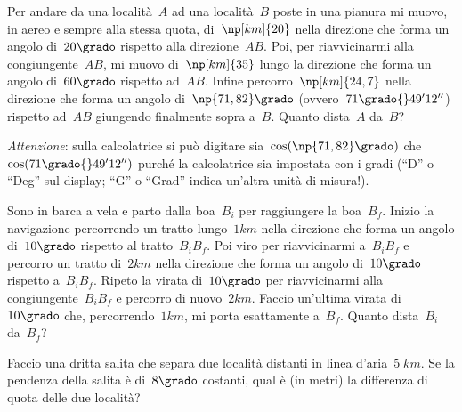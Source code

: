 \begin{multicols}{2}
\begin{esercizio}[\Ast]
\label{ese:C.43}
Per andare da una località~$A$ ad una località~$B$ poste in una pianura mi muovo, in aereo e sempre alla stessa quota, di~$\np[km]{20}$
nella direzione che forma un angolo di~$20\grado$ rispetto alla direzione~$AB$. Poi, per riavvicinarmi alla congiungente~$AB$,
mi muovo di~$\np[km]{35}$ lungo la direzione che forma un angolo di~$60\grado$ rispetto ad~$AB$. Infine percorro~$\np[km]{24,7}$
nella direzione che forma un angolo di~$\np{71,82}\grado$ (ovvero~$71\grado{}49'12''$) rispetto ad~$AB$ giungendo finalmente sopra a~$B$.
Quanto dista~$A$ da~$B$?

\emph{Attenzione}: sulla calcolatrice si può digitare sia~$\cos(\np{71,82}\grado)$ che~$\cos(71\grado{}49' 12'')$ purché la calcolatrice sia
impostata con i gradi (``D'' o ``Deg'' sul display; ``G'' o ``Grad'' indica un'altra unità di misura!).

\begin{center}
 
\end{center}
\end{esercizio}
\end{multicols}
\begin{esercizio}[\Ast]
\label{ese:C.44}
Sono in barca a vela e parto dalla boa~$B_i$ per raggiungere la boa~$B_f$. Inizio la navigazione percorrendo un tratto lungo~$1\unit{km}$
nella direzione che forma un angolo di~$10\grado$ rispetto al tratto~$B_i B_f$. Poi viro per riavvicinarmi a~$B_i B_f$ e percorro un tratto
di~$2\unit{km}$ nella direzione che forma un angolo di~$10\grado$ rispetto a~$B_i B_f$. Ripeto la virata di~$10\grado$ per
riavvicinarmi alla congiungente~$B_i B_f$ e percorro di nuovo~$2\unit{km}$. Faccio un'ultima virata di~$10\grado$ che, percorrendo~$1\unit{km}$,
mi porta esattamente a~$B_f$. Quanto dista~$B_i$ da~$B_f$?
\pagebreak
\begin{center}
 
\end{center}
\end{esercizio}

\begin{esercizio}[\Ast]
\label{ese:C.45}
Faccio una dritta salita che separa due località distanti in linea d'aria~$5\;\unit{km}$. Se la pendenza della salita è di~$8\grado$ costanti,
qual è (in metri) la differenza di quota delle due località?
\end{esercizio}

